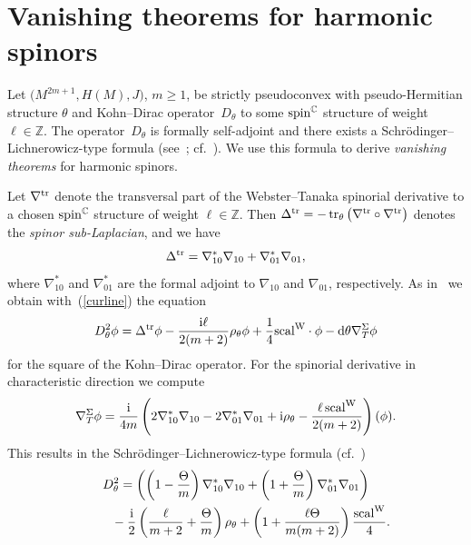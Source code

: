 \documentclass[pdftex]{sigma}
\numberwithin{equation}{section}
\newcommand{\ZZ}{\mathbb{Z}}
\newcommand{\CC}{\mathbb{C}}
\begin{document}
\section{Vanishing theorems for harmonic spinors} \label{Sec8}

Let $\big(M^{2m+1}, H(M), J\big)$, $m\geq 1$, be strictly pseudoconvex with pseudo-Hermitian structure $\theta$ and Kohn--Dirac operator~$D_\theta$ to some ${\rm spin}^\CC$ structure of weight $\ell\in\ZZ$.
The operator~$D_\theta$ is formally
self-adjoint and there exists a Schr\"odinger--Lichnerowicz-type formula (see~\cite{Pet}; cf.~\cite{LeiN1}).
We use this formula to derive {\em vanishing theorems} for harmonic spinors.

Let $\nabla^{\rm tr}$ denote the transversal part of the Webster--Tanaka spinorial derivative to a chosen
${\rm spin}^\CC$ structure of weight $\ell\in\ZZ$.
Then $\Delta^{\rm tr}=-\operatorname{tr}_{\theta} \big(\nabla^{\rm tr}\circ\nabla^{\rm tr}\big)$ denotes the {\em spinor sub-Laplacian}, and
we have
\[
\Delta^{\rm tr} = \nabla^*_{10}\nabla_{10} + \nabla^*_{01}\nabla_{01},
\]
where $\nabla^*_{10}$ and $\nabla^*_{01}$ are the formal adjoint to $\nabla_{10}$ and $\nabla_{01}$, respectively.
As in~\cite{LeiN1} we obtain with~(\ref{curline}) the equation
\begin{equation*}%
D_\theta^2\phi = \Delta^{\rm tr}\phi - \frac{{\rm i}\ell}{2(m+2)}\rho_\theta\phi + \frac{1}{4}{\rm scal}^{\rm W}\cdot\phi - {\rm d}\theta\nabla^{\Sigma}_T\phi
\end{equation*}
for the square of the Kohn--Dirac operator. For the spinorial derivative in characteristic direction we compute
\begin{gather*}%
\nabla^\Sigma_T\phi = \frac{{\rm i}}{4m}\left( 2\nabla^*_{10}\nabla_{10}-2\nabla^*_{01}\nabla_{01} + {\rm i}\rho_\theta - \frac{\ell \operatorname{scal}^{\rm W}}{2(m+2)}
\right)(\phi).
\end{gather*}
This results in the Schr\"odinger--Lichnerowicz-type formula (cf.~\cite{LeiN1, Pet})
\begin{gather}\nonumber
D_\theta^2 = \left( \left(1-\frac{\Theta}{m}\right) \nabla^*_{10}\nabla_{10} + \left(1+\frac{\Theta}{m}\right) \nabla^*_{01}\nabla_{01}\right)\\
\hphantom{D_\theta^2 =}{} - \frac{{\rm i}}{2}\left( \frac{\ell}{m+2}+\frac{\Theta}{m}\right)\rho_\theta + \left(1+\frac{\ell\Theta}{m(m+2)}\right)\frac{{\rm scal}^{\rm W}}{4}.\label{formtheo}
\end{gather}
\end{document}
